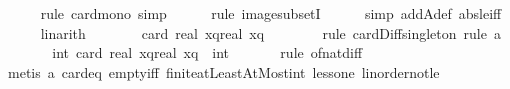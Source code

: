 \begin{isabellebody}
\ \ \ \ \isamarkupfalse%
\ {\isacharparenleft}{\kern0pt}rule\ card{\isacharunderscore}{\kern0pt}mono{\isacharcomma}{\kern0pt}\ simp{\isacharparenright}{\kern0pt}\isanewline
\ \ \ \ \isamarkupfalse%
\ {\isacharparenleft}{\kern0pt}rule\ image{\isacharunderscore}{\kern0pt}subsetI{\isacharparenright}{\kern0pt}\isanewline
\ \ \ \ \isamarkupfalse%
\ {\isacharparenleft}{\kern0pt}simp\ add{\isacharcolon}{\kern0pt}A{\isacharunderscore}{\kern0pt}def\ abs{\isacharunderscore}{\kern0pt}le{\isacharunderscore}{\kern0pt}iff{\isacharparenright}{\kern0pt}\isanewline
\ \ \ \ \isamarkupfalse%
\ linarith\isanewline
\ \ \isamarkupfalse%
\ \isamarkupfalse%
\ {\isachardoublequoteopen}{\isachardot}{\kern0pt}{\isachardot}{\kern0pt}{\isachardot}{\kern0pt}\ {\isacharequal}{\kern0pt}\ card\ {\isacharbraceleft}{\kern0pt}{\isasymlceil}real\ x{\isacharminus}{\kern0pt}q{\isasymrceil}{\isachardot}{\kern0pt}{\isachardot}{\kern0pt}{\isasymlfloor}real\ x{\isacharplus}{\kern0pt}q{\isasymrfloor}{\isacharbraceright}{\kern0pt}\ {\isacharminus}{\kern0pt}\ {}{\isachardoublequoteclose}\isanewline
\ \ \ \ \isamarkupfalse%
\ {\isacharparenleft}{\kern0pt}rule\ card{\isacharunderscore}{\kern0pt}Diff{\isacharunderscore}{\kern0pt}singleton{\isacharcomma}{\kern0pt}\ rule\ a{\isacharparenright}{\kern0pt}\isanewline
\ \ \isamarkupfalse%
\ \isamarkupfalse%
\ {\isachardoublequoteopen}{\isachardot}{\kern0pt}{\isachardot}{\kern0pt}{\isachardot}{\kern0pt}\ {\isacharequal}{\kern0pt}\ int\ {\isacharparenleft}{\kern0pt}card\ {\isacharbraceleft}{\kern0pt}{\isasymlceil}real\ x{\isacharminus}{\kern0pt}q{\isasymrceil}{\isachardot}{\kern0pt}{\isachardot}{\kern0pt}{\isasymlfloor}real\ x{\isacharplus}{\kern0pt}q{\isasymrfloor}{\isacharbraceright}{\kern0pt}{\isacharparenright}{\kern0pt}\ {\isacharminus}{\kern0pt}\ int\ {}{\isachardoublequoteclose}\isanewline
\ \ \ \ \isamarkupfalse%
\ {\isacharparenleft}{\kern0pt}rule\ of{\isacharunderscore}{\kern0pt}nat{\isacharunderscore}{\kern0pt}diff{\isacharparenright}{\kern0pt}\isanewline
\ \ \ \ \isamarkupfalse%
\ {\isacharparenleft}{\kern0pt}metis\ a\ card{\isacharunderscore}{\kern0pt}{}{\isacharunderscore}{\kern0pt}eq\ empty{\isacharunderscore}{\kern0pt}iff\ finite{\isacharunderscore}{\kern0pt}atLeastAtMost{\isacharunderscore}{\kern0pt}int\ less{\isacharunderscore}{\kern0pt}one\ linorder{\isacharunderscore}{\kern0pt}not{\isacharunderscore}{\kern0pt}le{\isacharparenright}{\kern0pt}\isanewline

\end{isabellebody}
